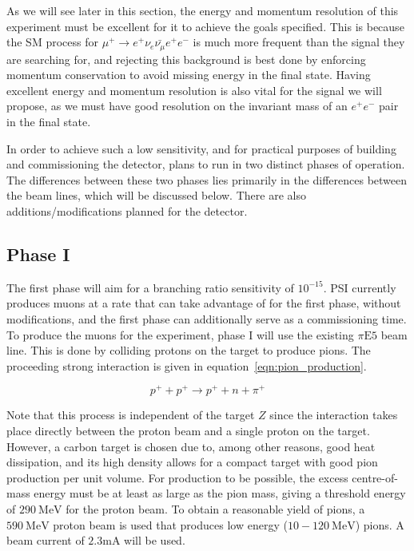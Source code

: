 As we will see later in this section, the energy and momentum resolution of this experiment must be excellent for it to achieve the goals specified.
This is because the SM process for $\mu^+ \rightarrow e^+ \nu_e \bar{\nu_\mu} e^+ e^-$ is much more frequent than the signal they are searching for, and rejecting this background is best done by enforcing momentum conservation to avoid missing energy in the final state.
Having excellent energy and momentum resolution is also vital for the signal we will propose, as we must have good resolution on the invariant mass of an $e^+ e^-$ pair in the final state.

In order to achieve such a low sensitivity, and for practical purposes of building and commissioning the detector, \mueee plans to run in two distinct phases of operation.
The differences between these two phases lies primarily in the differences between the beam lines, which will be discussed below.
There are also additions/modifications planned for the detector.

\subsection{Phase I}
The first phase will aim for a branching ratio sensitivity of $10^{-15}$.
PSI currently produces muons at a rate that \mueee can take advantage of for the first phase, without modifications, and the first phase can additionally serve as a commissioning time.
To produce the muons for the experiment, phase I will use the existing $\pi\textrm{E5}$ beam line.
This is done by colliding protons on the target to produce pions.
The proceeding strong interaction is given in equation~\ref{eqn:pion_production}.

\begin{equation}
\label{eqn:pion_production}
p^+ + p^+ \rightarrow p^+ + n + \pi^+
\end{equation}

\noindent Note that this process is independent of the target $Z$ since the interaction takes place directly between the proton beam and a single proton on the target.
However, a carbon target is chosen due to, among other reasons, good heat dissipation, and its high density allows for a compact target with good pion production per unit volume.
For production to be possible, the excess centre-of-mass energy must be at least as large as the pion mass, giving a threshold energy of $290~\textrm{MeV}$ for the proton beam.
To obtain a reasonable yield of pions, a $590~\textrm{MeV}$ proton beam is used that produces low energy ($10-120~\textrm{MeV}$) pions.
A beam current of $2.3\textrm{mA}$ will be used.

